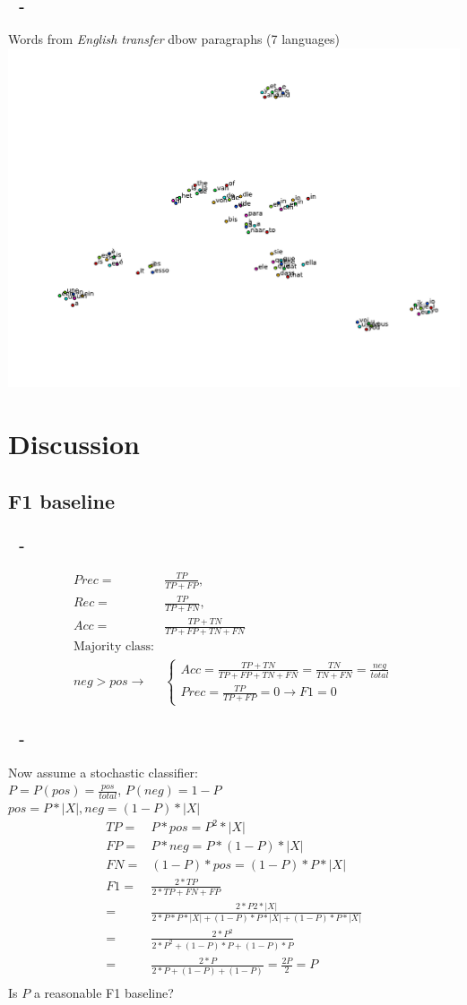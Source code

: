 \documentclass{beamer}
\newenvironment{dia}
{
\begin{frame}[fragile, environment=dia]
\frametitle{\insertsection
\ifx\insertsubsection\empty\else
      \,~-~\insertsubsection             %
   \fi}
}
{
\end{frame}
}
\begin{document}
\begin{dia}
Words from \emph{English transfer} dbow paragraphs (7 languages)
\includegraphics[width=1\linewidth]{figures/transfer_en10freq7}
\end{dia}

\section{Discussion}
\subsection*{F1 baseline}

\begin{dia}
\begin{align*}
Prec=&\frac{TP}{TP+FP}, \\
Rec=&\frac{TP}{TP+FN}, \\
Acc=&\frac{TP+TN}{TP+FP+TN+FN}\\
\text{Majority class:}\\
 neg>pos\rightarrow& \begin{cases}Acc=\frac{TP+TN}{TP+FP+TN+FN}=\frac{TN}{TN+FN}=\frac{neg}{total}\\Prec=\frac{TP}{TP+FP}=0\rightarrow F1=0\end{cases}
\end{align*}
\end{dia}
\begin{dia}
Now assume a stochastic classifier: \\
$P=P(pos)=\frac{pos}{total}$, $P(neg)=1-P$\\

$pos=P*|X|, neg=(1-P)*|X|$
\begin{align*}
TP=&P*pos=P^2*|X|\\
FP=&P*neg=P*(1-P)*|X|\\
FN=&(1-P)*pos=(1-P)*P*|X|\\
F1=&\frac{2*TP}{2*TP+FN+FP}\\
=&\frac{2*P2*|X|}{2*P*P*|X|+(1-P)*P*|X|+(1-P)*P*|X|}\\
=&\frac{2*P^2}{2*P^2+(1-P)*P+(1-P)*P}\\
=&\frac{2*P}{2*P+(1-P)+(1-P)}=\frac{2P}{2}=P\\
\end{align*}
Is $P$ a reasonable F1 baseline?
\end{dia}
\end{document}
